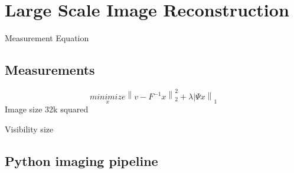 \section{Large Scale Image Reconstruction} \label{intro}

Measurement Equation

\subsection{Measurements}


\begin{equation}\label{intro:minimize}
	 \underset{x}{minimize} \left \| v - F^{-1}x \right \|^{2}_{2} + \lambda \left |\Psi x  \right \|_1
\end{equation}
Image size 32k squared

Visibility size

\subsection{Python imaging pipeline}

